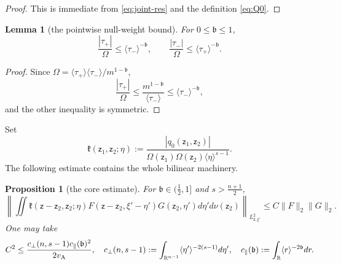 \documentclass[11pt,reqno]{amsart}
\theoremstyle{plain}
\newtheorem{proposition}[theorem]{Proposition}
\newtheorem{lemma}[theorem]{Lemma}
\theoremstyle{definition}
\theoremstyle{remark}
\numberwithin{equation}{section}
\newcommand{\breg}{\mathfrak b}
\newcommand{\Real}{\mathbb R}
\begin{document}
\begin{proof}
This is immediate from \eqref{eq:joint-res} and the definition \eqref{eq:Q0}.
\end{proof}

\begin{lemma}[the pointwise null-weight bound]\label{lem:pointwise}
For $0\le\breg\le1$,
\begin{equation}\label{eq:null-weight-pointwise}
 \frac{|\tau_+|}{\Omega}\le\langle\tau_-\rangle^{-\breg},
 \qquad
 \frac{|\tau_-|}{\Omega}\le\langle\tau_+\rangle^{-\breg}.
\end{equation}
\end{lemma}

\begin{proof}
Since $\Omega=\langle\tau_+\rangle\langle\tau_-\rangle/m^{1-\breg}$,
\[
 \frac{|\tau_+|}{\Omega}
 \le\frac{m^{1-\breg}}{\langle\tau_-\rangle}
 \le\langle\tau_-\rangle^{-\breg},
\]
and the other inequality is symmetric.
\end{proof}

Set
\[
 \mathfrak k(\mathsf z_1,\mathsf z_2;\eta)
 :=\frac{|q_0(\mathsf z_1,\mathsf z_2)|}
 {\Omega(\mathsf z_1)\Omega(\mathsf z_2)\langle\eta\rangle^{s-1}}.
\]
The following estimate contains the whole bilinear machinery.

\begin{proposition}[the core estimate]\label{prop:core}
For $\breg\in(\frac12,1]$ and $s>\frac{n+1}2$,
\begin{equation}\label{eq:core}
 \left\|
 \iint \mathfrak k(\mathsf z-\mathsf z_2,\mathsf z_2;\eta)
 F(\mathsf z-\mathsf z_2,\xi'-\eta')G(\mathsf z_2,\eta')
  d\eta' d\nu(\mathsf z_2)
 \right\|_{L^2_{\mathsf z,\xi'}}
 \le C\|F\|_2\|G\|_2 .
\end{equation}
One may take
\begin{equation}\label{eq:core-const}
 C^2\le
 \frac{c_\perp(n,s-1)c_\parallel(\breg)^2}{2v_{\rm A}},
 \quad
 c_\perp(n,s-1):=\int_{\Real^{n-1}}\langle\eta'\rangle^{-2(s-1)} d\eta',
 \quad
 c_\parallel(\breg):=\int_{\Real}\langle r\rangle^{-2\breg} dr .
\end{equation}
\end{proposition}
\end{document}
